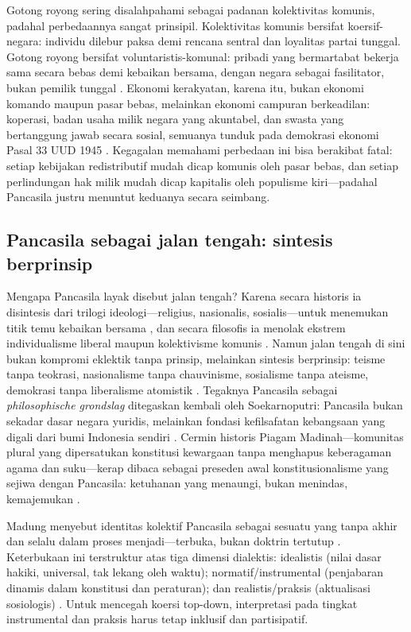 \documentclass[journal]{IEEEtran}
\begin{document}
Gotong royong sering disalahpahami sebagai padanan kolektivitas komunis, padahal perbedaannya sangat prinsipil. Kolektivitas komunis bersifat koersif-negara: individu dilebur paksa demi rencana sentral dan loyalitas partai tunggal. Gotong royong bersifat voluntaristis-komunal: pribadi yang bermartabat bekerja sama secara bebas demi kebaikan bersama, dengan negara sebagai fasilitator, bukan pemilik tunggal \cite{hatta1977,duha2022,latif2018}. Ekonomi kerakyatan, karena itu, bukan ekonomi komando maupun pasar bebas, melainkan ekonomi campuran berkeadilan: koperasi, badan usaha milik negara yang akuntabel, dan swasta yang bertanggung jawab secara sosial, semuanya tunduk pada demokrasi ekonomi Pasal 33 UUD 1945 \cite{uud1945,hatta1977}. Kegagalan memahami perbedaan ini bisa berakibat fatal: setiap kebijakan redistributif mudah dicap komunis oleh pasar bebas, dan setiap perlindungan hak milik mudah dicap kapitalis oleh populisme kiri---padahal Pancasila justru menuntut keduanya secara seimbang.

\subsection{Pancasila sebagai jalan tengah: sintesis berprinsip}

Mengapa Pancasila layak disebut jalan tengah? Karena secara historis ia disintesis dari trilogi ideologi---religius, nasionalis, sosialis---untuk menemukan titik temu kebaikan bersama \cite{latif2018}, dan secara filosofis ia menolak ekstrem individualisme liberal maupun kolektivisme komunis \cite{madung2016,duha2022}. Namun jalan tengah di sini bukan kompromi eklektik tanpa prinsip, melainkan sintesis berprinsip: teisme tanpa teokrasi, nasionalisme tanpa chauvinisme, sosialisme tanpa ateisme, demokrasi tanpa liberalisme atomistik \cite{madungmere2021,maarof2018,azra2017}. Tegaknya Pancasila sebagai \textit{philosophische grondslag} ditegaskan kembali oleh Soekarnoputri: Pancasila bukan sekadar dasar negara yuridis, melainkan fondasi kefilsafatan kebangsaan yang digali dari bumi Indonesia sendiri \cite{soekarnoputri2021,latif2018}. Cermin historis Piagam Madinah---komunitas plural yang dipersatukan konstitusi kewargaan tanpa menghapus keberagaman agama dan suku---kerap dibaca sebagai preseden awal konstitusionalisme yang sejiwa dengan Pancasila: ketuhanan yang menaungi, bukan menindas, kemajemukan \cite{nasution2025,maarof2018}.

Madung menyebut identitas kolektif Pancasila sebagai sesuatu yang tanpa akhir dan selalu dalam proses menjadi---terbuka, bukan doktrin tertutup \cite{madung2016}. Keterbukaan ini terstruktur atas tiga dimensi dialektis: idealistis (nilai dasar hakiki, universal, tak lekang oleh waktu); normatif/instrumental (penjabaran dinamis dalam konstitusi dan peraturan); dan realistis/praksis (aktualisasi sosiologis) \cite{notonagoro1975,suntana2023}. Untuk mencegah koersi top-down, interpretasi pada tingkat instrumental dan praksis harus tetap inklusif dan partisipatif.
\end{document}
